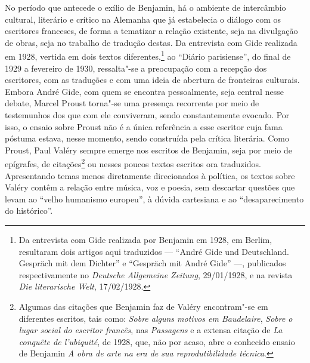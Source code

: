 No período que antecede o exílio de Benjamin, há o ambiente de
intercâmbio cultural, literário e crítico na Alemanha que já estabelecia
o diálogo com os escritores franceses, de forma a tematizar a relação
existente, seja na divulgação de obras, seja no trabalho de tradução
destas. Da entrevista com Gide realizada em 1928, vertida em dois textos
diferentes,\footnote{Da entrevista com Gide realizada por Benjamin em
  1928, em Berlim, resultaram dois artigos aqui traduzidos --- ``André Gide
  und Deutschland. Gespräch mit dem Dichter'' e ``Gespräch mit André
  Gide'' ---, publicados respectivamente no \emph{Deutsche Allgemeine
  Zeitung}, 29/01/1928, e na revista \emph{Die literarische Welt},
  17/02/1928.} ao ``Diário parisiense'', do final de 1929 a fevereiro de 1930, ressalta"-se a preocupação com a recepção dos escritores, com as traduções e com uma
ideia de abertura de fronteiras culturais. Embora André Gide, com quem se encontra
pessoalmente, seja central nesse debate, Marcel Proust torna"-se uma presença
recorrente por meio de testemunhos dos que com ele conviveram, sendo
constantemente evocado. Por isso, o ensaio sobre Proust não é a única
referência a esse escritor cuja fama póstuma estava, nesse momento,
sendo construída pela crítica literária.
Como Proust, Paul Valéry sempre emerge nos escritos de Benjamin, seja
por meio de epígrafes, de citações\footnote{Algumas das citações que Benjamin faz de Valéry encontram"-se em diferentes escritos, tais como: \emph{Sobre alguns motivos em Baudelaire}, \emph{Sobre o lugar social do escritor francês}, nas \emph{Passagens} e a extensa citação de \emph{La conquête de l'ubiquité}, de 1928, que, não por acaso, abre o conhecido ensaio de Benjamin \emph{A obra de arte na era de sua reprodutibilidade técnica}.} ou nesses poucos textos escritos ora
traduzidos. Apresentando temas menos diretamente direcionados à política, os textos sobre Valéry contêm a relação entre música, voz e poesia, sem descartar questões que levam ao ``velho humanismo europeu'', à dúvida cartesiana e ao ``desaparecimento do histórico''.


